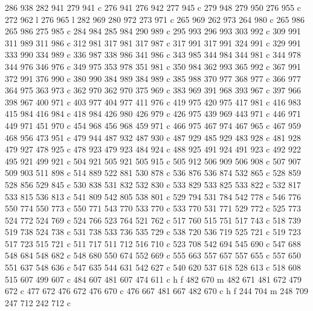 {{        286 938 282 941 279 941 c
        276 941 276 942 277 945 c
        279 948 279 950 276 955 c
        272 962 l
        276 965 l
        282 969 280 972 273 971 c
        265 969 262 973 264 980 c
        265 986 265 986 275 985 c
        284 984 285 984 290 989 c
        295 993 296 993 303 992 c
        309 991 311 989 311 986 c
        312 981 317 981 317 987 c
        317 991 317 991 324 991 c
        329 991 333 990 334 989 c
        336 987 338 986 341 986 c
        343 985 344 984 344 981 c
        344 978 344 976 346 976 c
        349 975 353 978 351 981 c
        350 984 362 993 365 992 c
        367 991 372 991 376 990 c
        380 990 384 989 384 989 c
        385 988 370 977 368 977 c
        366 977 364 975 363 973 c
        362 970 362 970 375 969 c
        383 969 391 968 393 967 c
        397 966 398 967 400 971 c
        403 977 404 977 411 976 c
        419 975 420 975 417 981 c
        416 983 415 984 416 984 c
        418 984 426 980 426 979 c
        426 975 439 969 443 971 c
        446 971 449 971 451 970 c
        454 968 456 968 459 971 c
        466 975 467 974 467 965 c
        467 959 468 956 473 951 c
        479 944 487 932 487 930 c
        487 929 485 929 483 928 c
        481 928 479 927 478 925 c
        478 923 479 923 484 924 c
        488 925 491 924 491 923 c
        492 922 495 921 499 921 c
        504 921 505 921 505 915 c
        505 912 506 909 506 908 c
        507 907 509 903 511 898 c
        514 889 522 881 530 878 c
        536 876 536 874 532 865 c
        528 859 528 856 529 845 c
        530 838 531 832 532 830 c
        533 829 533 825 533 822 c
        532 817 533 815 536 813 c
        541 809 542 805 538 801 c
        529 794 531 784 542 778 c
        546 776 550 774 550 773 c
        550 771 543 770 533 770 c
        533 770 531 771 529 772 c
        525 773 524 772 524 769 c
        524 766 523 764 521 762 c
        517 760 515 751 517 743 c
        518 739 519 738 524 738 c
        531 738 533 736 535 729 c
        538 720 536 719 525 721 c
        519 723 517 723 515 721 c
        511 717 511 712 516 710 c
        523 708 542 694 545 690 c
        547 688 548 684 548 682 c
        548 680 550 674 552 669 c
        555 663 557 657 557 655 c
        557 650 551 637 548 636 c
        547 635 544 631 542 627 c
        540 620 537 618 528 613 c
        518 608 515 607 499 607 c
        484 607 481 607 474 611 c
        h f
        482 670 m
        482 671 481 672 479 672 c
        477 672 476 672 476 670 c
        476 667 481 667 482 670 c
        h f
        244 704 m
        248 709 247 712 242 712 c
}}
